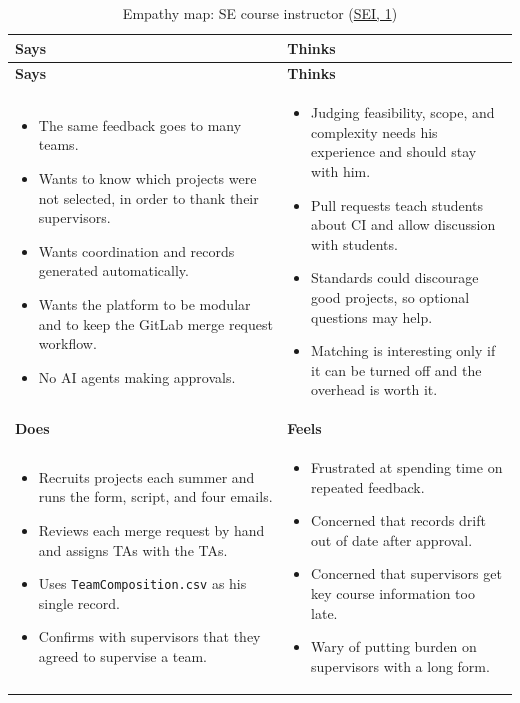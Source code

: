 \documentclass{article}
\newcommand{\intlink}[3]{\hyperref[int:#1-#2]{#3}}
\newcommand{\intref}[2]{\intlink{#1}{#2}{#1, #2}}
\newcommand{\empathymap}[6]{%
    \begin{longtable}{|p{0.465\textwidth}|p{0.465\textwidth}|}
    \caption{#1}\label{#2}\\
    \hline
    \textbf{Says} & \textbf{Thinks}\\ \hline
    \endfirsthead
    \hline
    \textbf{Says} & \textbf{Thinks}\\ \hline
    \endhead
    #3 & #4 \\ \hline
    \textbf{Does} & \textbf{Feels}\\ \hline
    #5 & #6 \\ \hline
    \end{longtable}}
\begin{document}
    \empathymap{Empathy map: SE course instructor (\intref{SEI}{1})}{tab:map-sei}
    {\begin{itemize}
         \item The same feedback goes to many teams.
         \item Wants to know which projects were not selected, in order to thank their supervisors.
         \item Wants coordination and records generated automatically.
         \item Wants the platform to be modular and to keep the GitLab merge request workflow.
         \item No AI agents making approvals.
    \end{itemize}}
    {\begin{itemize}
         \item Judging feasibility, scope, and complexity needs his experience and should stay with him.
         \item Pull requests teach students about CI and allow discussion with students.
         \item Standards could discourage good projects, so optional questions may help.
         \item Matching is interesting only if it can be turned off and the overhead is worth it.
    \end{itemize}}
    {\begin{itemize}
         \item Recruits projects each summer and runs the form, script, and four emails.
         \item Reviews each merge request by hand and assigns TAs with the TAs.
         \item Uses \texttt{TeamComposition.csv} as his single record.
         \item Confirms with supervisors that they agreed to supervise a team.
    \end{itemize}}
    {\begin{itemize}
         \item Frustrated at spending time on repeated feedback.
         \item Concerned that records drift out of date after approval.
         \item Concerned that supervisors get key course information too late.
         \item Wary of putting burden on supervisors with a long form.
    \end{itemize}}
\end{document}
